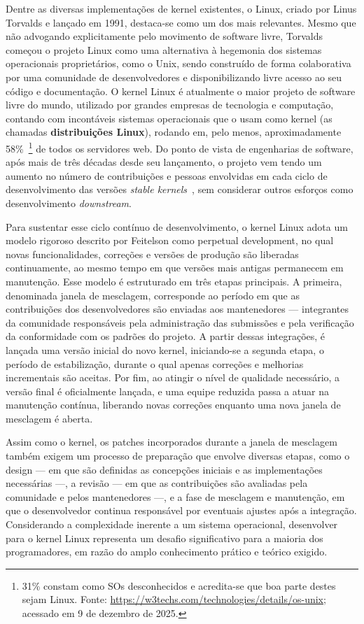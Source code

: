 Dentre as diversas implementações de kernel existentes, o Linux, criado por Linus Torvalds e lançado em 1991, destaca-se como um dos mais relevantes. Mesmo que não advogando explicitamente pelo movimento de software livre, Torvalds começou o projeto Linux como uma alternativa à hegemonia dos sistemas operacionais proprietários, como o Unix, sendo construído de forma colaborativa por uma comunidade de desenvolvedores e disponibilizando livre acesso ao seu código e documentação. O kernel Linux é atualmente o maior projeto de software livre do mundo, utilizado por grandes empresas de tecnologia e computação, contando com incontáveis sistemas operacionais que o usam como kernel (as chamadas \textbf{distribuições Linux}), rodando em, pelo menos, aproximadamente 58\%~\footnote{31\% constam como SOs desconhecidos e acredita-se que boa parte destes sejam Linux. Fonte: \url{https://w3techs.com/technologies/details/os-unix}; acessado em 9 de dezembro de 2025.} de todos os servidores web. Do ponto de vista de engenharias de software, após mais de três décadas desde seu lançamento, o projeto vem tendo um aumento no número de contribuições e pessoas envolvidas em cada ciclo de desenvolvimento das versões \textit{stable kernels}~\cite{passos2025duksvissoft}, sem considerar outros esforços como desenvolvimento \textit{downstream}.

Para sustentar esse ciclo contínuo de desenvolvimento, o kernel Linux adota um modelo rigoroso descrito por Feitelson como perpetual development, no qual novas funcionalidades, correções e versões de produção são liberadas continuamente, ao mesmo tempo em que versões mais antigas permanecem em manutenção. Esse modelo é estruturado em três etapas principais. A primeira, denominada janela de mesclagem, corresponde ao período em que as contribuições dos desenvolvedores são enviadas aos mantenedores — integrantes da comunidade responsáveis pela administração das submissões e pela verificação da conformidade com os padrões do projeto. A partir dessas integrações, é lançada uma versão inicial do novo kernel, iniciando-se a segunda etapa, o período de estabilização, durante o qual apenas correções e melhorias incrementais são aceitas. Por fim, ao atingir o nível de qualidade necessário, a versão final é oficialmente lançada, e uma equipe reduzida passa a atuar na manutenção contínua, liberando novas correções enquanto uma nova janela de mesclagem é aberta.

Assim como o kernel, os patches incorporados durante a janela de mesclagem também exigem um processo de preparação que envolve diversas etapas, como o design — em que são definidas as concepções iniciais e as implementações necessárias —, a revisão — em que as contribuições são avaliadas pela comunidade e pelos mantenedores —, e a fase de mesclagem e manutenção, em que o desenvolvedor continua responsável por eventuais ajustes após a integração. Considerando a complexidade inerente a um sistema operacional, desenvolver para o kernel Linux representa um desafio significativo para a maioria dos programadores, em razão do amplo conhecimento prático e teórico exigido.

